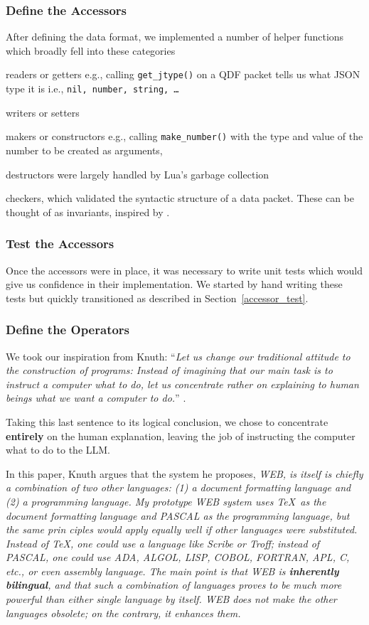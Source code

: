 \documentclass[letterpaper,12pt]{article}
\begin{document}
\subsubsection{Define the Accessors}
\label{accessor_defn}

After defining the data format, we implemented a number of helper 
functions which broadly fell into these categories
\be
\item readers or getters e.g., calling {\tt get\_jtype()} on a QDF packet tells
  us what JSON type it is i.e., {\tt nil, number, string, \ldots}
\item writers or setters
\item makers or constructors e.g., calling {\tt make\_number()} with the 
  type and value of the number to be created as arguments, 
\item destructors were largely handled by Lua's garbage collection
\item checkers, which validated the syntactic structure of a data packet.
  These can be thought of as invariants, 
  inspired by \cite{hoare1969axiomatic}.

  \ee

\subsubsection{Test the Accessors}
Once the accessors were in place, it was necessary to write unit tests which
would give us confidence in their implementation. We started by hand writing
these tests but quickly transitioned as described in
Section~\ref{accessor_test}. %

\subsubsection{Define the Operators}

We took our inspiration from Knuth: ``{\em Let us change our traditional attitude to the construction of programs: 
Instead of imagining that our main task is to 
instruct a computer what to do, let us concentrate rather on explaining
to human beings what we want a computer to do.}'' \cite{knuth1984literate}.

Taking this last sentence to its logical conclusion, we chose to 
concentrate {\bf entirely} on the human explanation, 
leaving the job of instructing the computer what to do to the LLM.

In this paper, Knuth argues that the system he proposes, 
{\em WEB, is 
itself is chiefly a combination of two other languages: (1) a document formatting language and (2) a
programming language. My prototype WEB system uses
\TeX\ as the document formatting language and PASCAL
as the programming language, but the same prin ciples would apply equally well if other languages were
substituted. Instead of \TeX, one could use a language
like Scribe or Troﬀ; instead of PASCAL, one could use
ADA, ALGOL, LISP, COBOL, FORTRAN, APL, C, etc.,
or even assembly language. The main point is that WEB
is {\bf inherently bilingual}, and that such a combination of
languages proves to be much more powerful than either
single language by itself. WEB does not make the other
languages obsolete; on the contrary, it enhances them.
}
\end{document}

